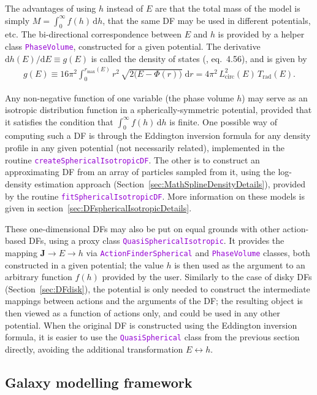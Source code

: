 \documentclass[12pt]{article}
\newcommand{\ttt}[1]{\textcolor{darkviolet}{\texttt{#1}}}
\renewcommand{\d}{\mathrm{d}}
\newcommand{\bJ}{\boldsymbol{J}}
\begin{document}
The advantages of using $h$ instead of $E$ are that the total mass of the model is simply $M=\int_0^\infty f(h)\,\d h$, that the same DF may be used in different potentials, etc. The bi-directional correspondence between $E$ and $h$ is provided by a helper class \ttt{PhaseVolume}, constructed for a given potential. The derivative $\d h(E)/\d E \equiv g(E)$ is called the density of states (\cite{BinneyTremaine}, eq.~4.56), and is given by
\begin{align*}
g(E) \equiv 16\pi^2 \int_0^{r_\mathrm{max}(E)} r^2\, \sqrt{2\big(E-\Phi(r)\big)}\;\d r 
= 4\pi^2\,L^2_\mathrm{circ}(E)\,T_\mathrm{rad}(E).
\end{align*}

Any non-negative function of one variable (the phase volume $h$) may serve as an isotropic distribution function in a spherically-symmetric potential, provided that it satisfies the condition that $\int_0^\infty f(h)\, \d h$ is finite. 
One possible way of computing such a DF is through the Eddington inversion formula for any density profile in any given potential (not necessarily related), implemented in the routine \ttt{createSphericalIsotropicDF}. The other is to construct an approximating DF from an array of particles sampled from it, using the log-density estimation approach (Section~\ref{sec:MathSplineDensityDetails}), provided by the routine \ttt{fitSphericalIsotropicDF}.
More information on these models is given in section~\ref{sec:DFsphericalIsotropicDetails}.

These one-dimensional DFs may also be put on equal grounds with other action-based DFs, using a proxy class \ttt{QuasiSphericalIsotropic}. It provides the mapping $\bJ \to E \to h$ via \ttt{ActionFinderSpherical} and \ttt{PhaseVolume} classes, both constructed in a given potential; the value $h$ is then used as the argument to an arbitrary function $f(h)$ provided by the user. Similarly to the case of disky DFs (Section~\ref{sec:DFdisk}), the potential is only needed to construct the intermediate mappings between actions and the arguments of the DF; the resulting object is then viewed as a function of actions only, and could be used in any other potential.
When the original DF is constructed using the Eddington inversion formula, it is easier to use the \ttt{QuasiSpherical} class from the previous section directly, avoiding the additional transformation $E\leftrightarrow h$.


\subsection{Galaxy modelling framework}  \label{sec:GalaxyModel}
\end{document}

